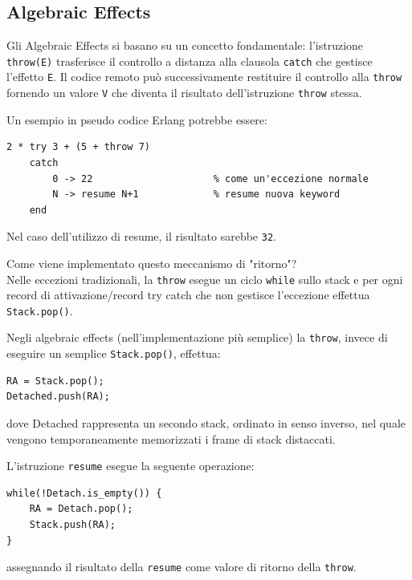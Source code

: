 \documentclass{article}
\begin{document}
\pagebreak

\subsection*{Algebraic Effects}
Gli Algebraic Effects si basano su un concetto fondamentale: l'istruzione \texttt{throw(E)} trasferisce il controllo a distanza alla clausola \texttt{catch} che gestisce l'effetto \texttt{E}. Il codice remoto può successivamente restituire il controllo alla \texttt{throw} fornendo un valore \texttt{V} che diventa il risultato dell'istruzione \texttt{throw} stessa.

Un esempio in pseudo codice Erlang potrebbe essere:
\begin{tcolorbox}
\begin{verbatim}
2 * try 3 + (5 + throw 7)
    catch
        0 -> 22                     % come un'eccezione normale
        N -> resume N+1             % resume nuova keyword
    end
\end{verbatim}
\end{tcolorbox}
Nel caso dell'utilizzo di resume, il risultato sarebbe \texttt{32}.

Come viene implementato questo meccanismo di "ritorno"?\\
Nelle eccezioni tradizionali, la \texttt{throw} esegue un ciclo \texttt{while} sullo stack e per ogni record di attivazione/record try catch che non gestisce l'eccezione effettua \texttt{Stack.pop()}.

Negli algebraic effects (nell'implementazione più semplice) la \texttt{throw}, invece di eseguire un semplice \texttt{Stack.pop()}, effettua:
\begin{tcolorbox}
\begin{verbatim}
RA = Stack.pop();
Detached.push(RA);
\end{verbatim}
\end{tcolorbox}
dove Detached rappresenta un secondo stack, ordinato in senso inverso, nel quale vengono temporaneamente memorizzati i frame di stack distaccati.

L'istruzione \texttt{resume} esegue la seguente operazione:
\begin{tcolorbox}
\begin{verbatim}
while(!Detach.is_empty()) {
    RA = Detach.pop();
    Stack.push(RA);
}
\end{verbatim}
\end{tcolorbox}
assegnando il risultato della \texttt{resume} come valore di ritorno della \texttt{throw}.
\end{document}
